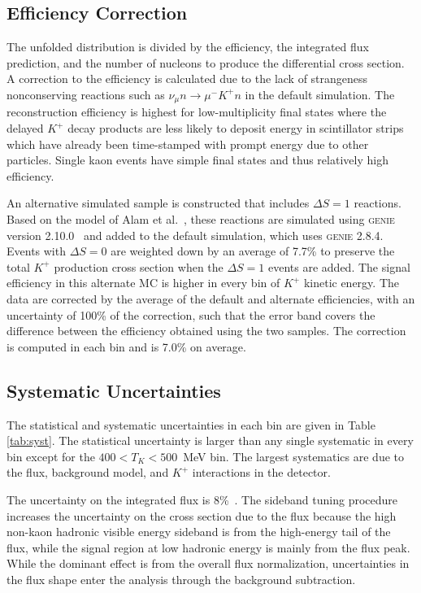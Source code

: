 \documentclass[aps,prl,preprint,showpacs,superscriptaddress,nofootinbib,floatfix,linenumbers]{revtex4}
\newcommand{\genie}{\textsc{genie}\xspace}
\newcommand{\numu}{\ensuremath{\nu_{\mu}}\xspace}
\newcommand{\kp}{\ensuremath{K^{+}}\xspace}
\newcommand{\muminus}{\ensuremath{\mu^{-}}\xspace}
\begin{document}
\subsection{Efficiency Correction}

The unfolded distribution is divided by the efficiency, the integrated flux prediction, and the number of nucleons to produce the differential cross section. A correction to the efficiency is calculated due to the lack of strangeness nonconserving reactions such as $\numu n \rightarrow \muminus \kp n$ in the default simulation. The reconstruction efficiency is highest for low-multiplicity final states where the delayed \kp decay products are less likely to deposit energy in scintillator strips which have already been time-stamped with prompt energy due to other particles. Single kaon events have simple final states and thus relatively high efficiency.

An alternative simulated sample is constructed that includes $\Delta S = 1$ reactions. Based on the model of Alam et al.~\cite{atharSK}, these reactions are simulated using \genie version 2.10.0~\cite{genie210} and added to the default simulation, which uses \genie 2.8.4. Events with $\Delta S = 0$ are weighted down by an average of 7.7\% to preserve the total \kp production cross section when the $\Delta S = 1$ events are added. The signal efficiency in this alternate MC is higher in every bin of \kp kinetic energy. The data are corrected by the average of the default and alternate efficiencies, with an uncertainty of 100\% of the correction, such that the error band covers the difference between the efficiency obtained using the two samples. The correction is computed in each bin and is 7.0\% on average.

\subsection{Systematic Uncertainties}

The statistical and systematic uncertainties in each bin are given in Table \ref{tab:syst}. The statistical uncertainty is larger than any single systematic in every bin except for the $400 < T_{K} < 500$~MeV bin. The largest systematics are due to the flux, background model, and \kp interactions in the detector. 

The uncertainty on the integrated flux is 8\%~\cite{MINERvAflux}. The sideband tuning procedure increases the uncertainty on the cross section due to the flux because the high non-kaon hadronic visible energy sideband is from the high-energy tail of the flux, while the signal region at low hadronic energy is mainly from the flux peak. While the dominant effect is from the overall flux normalization, uncertainties in the flux shape enter the analysis through the background subtraction.
\end{document}
